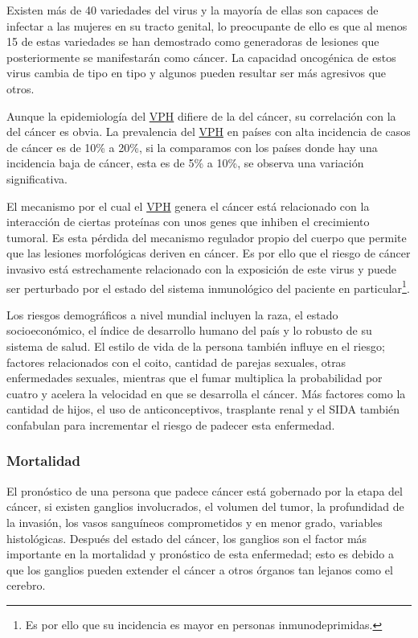 
Existen más de 40 variedades del virus y la mayoría de ellas son capaces de
infectar a las mujeres en su tracto genital, lo preocupante de ello es que al
menos 15 de estas variedades se han demostrado como generadoras de  lesiones que
posteriormente se manifestarán como cáncer. La capacidad oncogénica de estos
virus cambia de tipo en tipo y algunos pueden resultar ser más agresivos que
otros. 

Aunque la epidemiología del \hyperlink{abbr}{VPH} difiere de la del cáncer, su
correlación con la del cáncer es obvia. La prevalencia del \hyperlink{abbr}{VPH}
en países con alta incidencia de casos de cáncer es de 10\% a 20\%, si la
comparamos con los países donde hay una incidencia baja de cáncer, esta es de
5\% a 10\%, se observa una variación significativa. 

El mecanismo por el cual el \hyperlink{abbr}{VPH} genera el cáncer está
relacionado con la interacción de ciertas proteínas con unos genes que inhiben
el crecimiento tumoral. Es esta pérdida del mecanismo regulador propio del
cuerpo que permite que las lesiones morfológicas deriven en cáncer. Es por ello
que el riesgo de cáncer invasivo está estrechamente relacionado con la
exposición de este virus y puede ser perturbado por el estado del sistema
inmunológico del paciente en particular\footnote{Es por ello que su incidencia
es mayor en personas inmunodeprimidas.}. 

Los riesgos demográficos a nivel mundial incluyen la raza, el estado
socioeconómico, el índice de desarrollo humano del país y lo robusto de su
sistema de salud. El estilo de vida de la persona también influye en el riesgo;
factores relacionados con el coito, cantidad de parejas sexuales, otras
enfermedades sexuales, mientras que el fumar multiplica la probabilidad por
cuatro y acelera la velocidad en que se desarrolla el cáncer. Más factores como
la cantidad de hijos, el uso de anticonceptivos, trasplante renal y el SIDA
también confabulan para incrementar el riesgo de padecer esta enfermedad.

\subsubsection{Mortalidad}
El pronóstico de una persona que padece cáncer está gobernado por la etapa del
cáncer, si existen ganglios involucrados, el volumen del tumor, la profundidad
de la invasión, los vasos sanguíneos comprometidos y en menor grado, variables
histológicas. Después del estado del cáncer, los ganglios son el factor más
importante en la mortalidad y pronóstico de esta enfermedad; esto es debido a
que los ganglios pueden extender el cáncer a otros órganos tan lejanos como el
cerebro.

